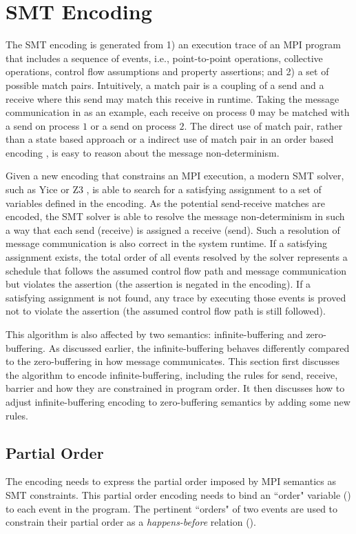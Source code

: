 \section{SMT Encoding}
The SMT encoding is generated from 1) an execution trace of an MPI program that includes a sequence of events, i.e., point-to-point operations, collective operations, control flow assumptions and property assertions; and 2) a set of possible match pairs. Intuitively, a match pair is a coupling of a send and a receive where this send may match this receive in runtime. Taking the message communication in  as an example, each receive on process $0$ may be matched with a send on process $1$ or a send on process $2$. The direct use of match pair, rather than a state based approach \cite{} or a indirect use of match pair in an order based encoding \cite{}, is easy to reason about the message non-determinism. 

Given a new encoding that constrains an MPI execution, a modern SMT solver, such as Yice \cite{} or Z3 \cite{}, is able to search for a satisfying assignment to a set of variables defined in the encoding. As the potential send-receive matches are encoded, the SMT solver is able to resolve the message non-determinism in such a way that each send (receive) is assigned a receive (send). Such a resolution of message communication is also correct in the system runtime. If a satisfying assignment exists, the total order of all events resolved by the solver represents a schedule that follows the assumed control flow path and message communication but violates the assertion (the assertion is negated in the encoding). If a satisfying assignment is not found, any trace by executing those events is proved not to violate the assertion (the assumed control flow path is still followed).

This algorithm is also affected by two semantics: infinite-buffering and zero-buffering. As discussed earlier, the infinite-buffering behaves differently compared to the zero-buffering in how message communicates. 
This section first discusses the algorithm to encode infinite-buffering, including the rules for send, receive, barrier and how they are constrained in program order. It then discusses how to adjust infinite-buffering encoding to zero-buffering semantics by adding some new rules.

\subsection{Partial Order}
The encoding needs to express the partial order imposed by MPI semantics as SMT constraints. This partial order encoding needs to bind an ``order" variable () to each event in the program. The pertinent ``orders" of two events are used to constrain their partial order as a \emph{happens-before} relation ().

